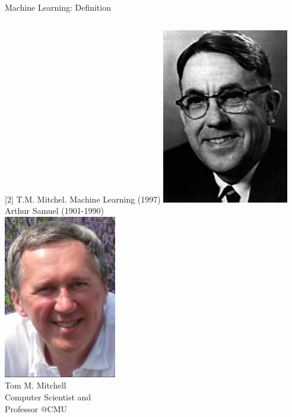 \documentclass[aspectratio=169,10pt]{beamer}
\begin{document}
\begin{frame}{Machine Learning: Definition}
\begin{columns}
	{\footnotesize	[2] T.M. Mitchel. Machine Learning (1997)}
		\centering
		\onslide
			\includegraphics[width=0.4\linewidth, clip]{images/arthur_samuel}\\
			\vspace{-0.2cm} 
			{\tiny Arthur Samuel (1901-1990)}\\
			\vspace{0.3cm}
			\includegraphics[width=0.4\linewidth, clip]{images/tom_mitchell}\\
				{\tiny Tom M. Mitchell}\\
				\vspace{-0.2cm} 
				{\tiny Computer Scientist and}\\
				\vspace{-0.2cm} 
				{\tiny Professor @CMU}
	\end{columns}
 
\end{frame}
\end{document}
